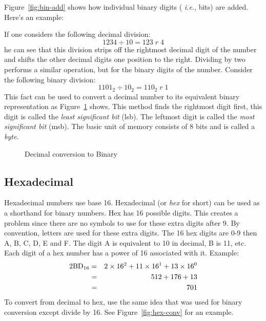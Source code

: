 Figure~\ref{fig:bin-add} shows how individual binary digits ({\em
i.e.}, bits) are added. Here's an example:



If one considers the following decimal division:
\[ 1234 \div 10 = 123\; r\; 4 \]
he can see that this division strips off the rightmost decimal digit of
the number and shifts the other decimal digits one position to the right.
Dividing by two performs a similar operation, but for the binary digits
of the number. Consider the following binary division:
\[ 1101_2 \div 10_2 = 110_2\; r\; 1 \]
This fact can be used to convert a decimal
number to its equivalent binary representation as
Figure~\ref{fig:dec-convert} shows. This method finds the rightmost
digit first, this digit is called the \emph{least significant bit} (lsb).
The leftmost digit is called the \emph{most significant bit} (msb).
The basic unit of memory consists of 8 bits and is called a \emph{byte}.

\begin{figure}[t]
{}
\caption{Decimal conversion to Binary \label{fig:dec-convert}}
\end{figure}

\subsection{Hexadecimal}

Hexadecimal numbers use base 16. Hexadecimal (or \emph{hex} for short) can be
used as a shorthand for binary numbers. Hex has 16 possible
digits. This creates a problem since there are no symbols to use for
these extra digits after 9. By convention, letters are used for these
extra digits. The 16 hex digits are 0-9 then A, B, C, D, E and F. The
digit A is equivalent to 10 in decimal, B is 11, etc. Each digit of a
hex number has a power of 16 associated with it. Example:
\begin{eqnarray*}
\rm
2BD_{16} & = & 2 \times 16^2 + 11 \times 16^1 + 13 \times 16^0 \\
         & = & 512 + 176 + 13 \\
         & = & 701 \\
\end{eqnarray*}
To convert from decimal to hex, use the same idea that was used for
binary conversion except divide by 16. See Figure~\ref{fig:hex-conv} for
an example.

